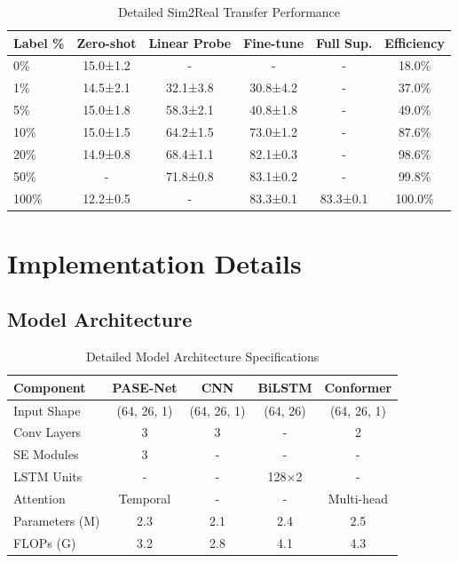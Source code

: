 \documentclass[10pt,journal,compsoc]{IEEEtran}
\begin{document}
\begin{table}[h!]
\centering
\caption{Detailed Sim2Real Transfer Performance}
\label{tab:s5_sim2real}
\begin{tabular}{@{}lccccc@{}}
\toprule
\textbf{Label \%} & \textbf{Zero-shot} & \textbf{Linear Probe} & \textbf{Fine-tune} & \textbf{Full Sup.} & \textbf{Efficiency} \\
\midrule
0\% & 15.0±1.2 & - & - & - & 18.0\% \\
1\% & 14.5±2.1 & 32.1±3.8 & 30.8±4.2 & - & 37.0\% \\
5\% & 15.0±1.8 & 58.3±2.1 & 40.8±1.8 & - & 49.0\% \\
10\% & 15.0±1.5 & 64.2±1.5 & 73.0±1.2 & - & 87.6\% \\
20\% & 14.9±0.8 & 68.4±1.1 & 82.1±0.3 & - & 98.6\% \\
50\% & - & 71.8±0.8 & 83.1±0.2 & - & 99.8\% \\
100\% & 12.2±0.5 & - & 83.3±0.1 & 83.3±0.1 & 100.0\% \\
\bottomrule
\end{tabular}
\end{table}

\section{Implementation Details}

\subsection{Model Architecture}

\begin{table}[h!]
\centering
\caption{Detailed Model Architecture Specifications}
\label{tab:s6_architecture}
\begin{tabular}{@{}lcccc@{}}
\toprule
\textbf{Component} & \textbf{PASE-Net} & \textbf{CNN} & \textbf{BiLSTM} & \textbf{Conformer} \\
\midrule
Input Shape & (64, 26, 1) & (64, 26, 1) & (64, 26) & (64, 26, 1) \\
Conv Layers & 3 & 3 & - & 2 \\
SE Modules & 3 & - & - & - \\
LSTM Units & - & - & 128×2 & - \\
Attention & Temporal & - & - & Multi-head \\
Parameters (M) & 2.3 & 2.1 & 2.4 & 2.5 \\
FLOPs (G) & 3.2 & 2.8 & 4.1 & 4.3 \\
\bottomrule
\end{tabular}
\end{table}
\end{document}
